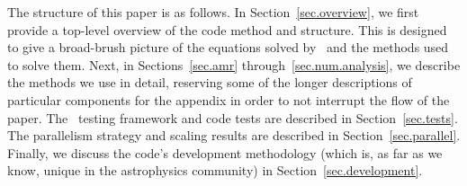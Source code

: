 The structure of this paper is as follows.  In
Section~\ref{sec.overview}, we first provide a top-level overview of
the code method and structure.  This is designed to give a broad-brush
picture of the equations solved by \enzo\ and the methods used to
solve them.  Next, in Sections~\ref{sec.amr}
through~\ref{sec.num.analysis}, we describe the methods we use in
detail, reserving some of the longer descriptions of particular
components for the appendix in order to not interrupt the flow of the
paper.  The \enzo\ testing framework and code tests are described in
Section~\ref{sec.tests}.  The parallelism strategy and scaling results
are described in Section~\ref{sec.parallel}.  Finally, we discuss the
code's development methodology (which is, as far as we know, unique in
the astrophysics community) in Section~\ref{sec.development}.
